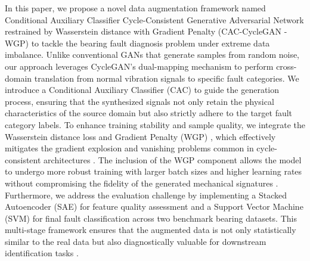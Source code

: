 In this paper, we propose a novel data augmentation framework named Conditional Auxiliary Classifier Cycle-Consistent Generative Adversarial Network restrained by Wasserstein distance with Gradient Penalty (CAC-CycleGAN \cite{wang2024cyclegan_signal_aug}-WGP) to tackle the bearing fault diagnosis problem under extreme data imbalance. Unlike conventional GANs that generate samples from random noise, our approach leverages CycleGAN's dual-mapping mechanism \cite{zhu2017cyclegan, fernandez2022cyclegan_bearing} to perform cross-domain translation from normal vibration signals to specific fault categories. We introduce a Conditional Auxiliary Classifier (CAC) \cite{odena2017acgan, meng2022iacgan} to guide the generation process, ensuring that the synthesized signals not only retain the physical characteristics of the source domain but also strictly adhere to the target fault category labels. To enhance training stability and sample quality, we integrate the Wasserstein distance loss and Gradient Penalty (WGP) \cite{gulrajani2017wgangp, han2020wgangp_bearing}, which effectively mitigates the gradient explosion and vanishing problems common in cycle-consistent architectures \cite{zhang2022cwgan_gp, li2022cwgan_gp_pca}. The inclusion of the WGP component allows the model to undergo more robust training with larger batch sizes and higher learning rates without compromising the fidelity of the generated mechanical signatures \cite{gulrajani2017wgangp, li2021wgan_gp_fault}. Furthermore, we address the evaluation challenge by implementing a Stacked Autoencoder (SAE) \cite{hinton2006sae, shao2018sae_bearing, jia2016sae_bearing} for feature quality assessment and a Support Vector Machine (SVM) \cite{cortes1995svm, support2019svm_bearing, samanta2006svm_bearing} for final fault classification across two benchmark bearing datasets. This multi-stage framework ensures that the augmented data is not only statistically similar to the real data but also diagnostically valuable for downstream identification tasks \cite{shao2018sae_bearing, support2019svm_bearing}.

